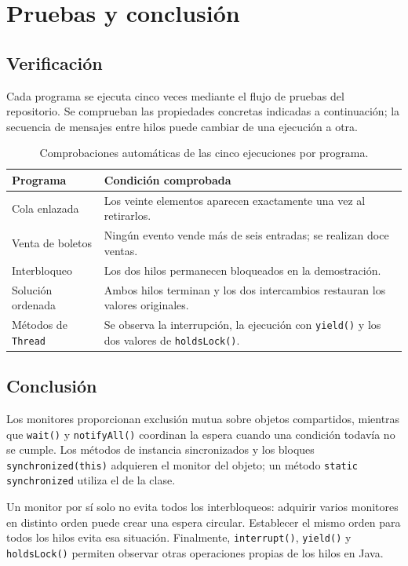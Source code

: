 \documentclass[12pt,oneside]{book}
\begin{document}

\chapter{Pruebas y conclusión}
\section{Verificación}
Cada programa se ejecuta cinco veces mediante el flujo de pruebas del repositorio. Se comprueban las propiedades concretas indicadas a continuación; la secuencia de mensajes entre hilos puede cambiar de una ejecución a otra.

\begin{table}[H]\centering
\caption{Comprobaciones automáticas de las cinco ejecuciones por programa.}
\begin{tabularx}{\textwidth}{P{4.0cm} L}
\toprule
\textbf{Programa} & \textbf{Condición comprobada}\\\midrule
Cola enlazada & Los veinte elementos aparecen exactamente una vez al retirarlos.\\
Venta de boletos & Ningún evento vende más de seis entradas; se realizan doce ventas.\\
Interbloqueo & Los dos hilos permanecen bloqueados en la demostración.\\
Solución ordenada & Ambos hilos terminan y los dos intercambios restauran los valores originales.\\
Métodos de \texttt{Thread} & Se observa la interrupción, la ejecución con \texttt{yield()} y los dos valores de \texttt{holdsLock()}.\\\bottomrule
\end{tabularx}
\end{table}

\section{Conclusión}
Los monitores proporcionan exclusión mutua sobre objetos compartidos, mientras que \texttt{wait()} y \texttt{notifyAll()} coordinan la espera cuando una condición todavía no se cumple. Los métodos de instancia sincronizados y los bloques \texttt{synchronized(this)} adquieren el monitor del objeto; un método \texttt{static synchronized} utiliza el de la clase.

Un monitor por sí solo no evita todos los interbloqueos: adquirir varios monitores en distinto orden puede crear una espera circular. Establecer el mismo orden para todos los hilos evita esa situación. Finalmente, \texttt{interrupt()}, \texttt{yield()} y \texttt{holdsLock()} permiten observar otras operaciones propias de los hilos en Java.
\end{document}

